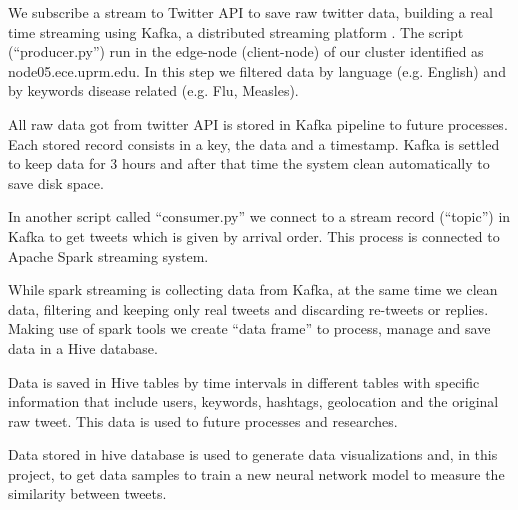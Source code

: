 \documentclass[12pt]{report}
\begin{document}
\begin{steps}
\item We subscribe a stream to Twitter \ac{API} to save raw twitter data, building a real time streaming using Kafka, a distributed streaming platform \cite{Kafka2019}. The script (``producer.py'') run in the edge-node (client-node) of our cluster identified as node05.ece.uprm.edu. In this step we filtered data by language (e.g. English) and by keywords disease related (e.g. Flu, Measles).

\item All raw data got from twitter \ac{API} is stored in Kafka pipeline to future processes. Each stored record consists in a key, the data and a timestamp. Kafka is settled to keep data for 3 hours and after that time the system clean automatically to save disk space. 

\item In another script called ``consumer.py'' we connect to a stream record (``topic'') in Kafka to get tweets which is given by arrival order. This process is connected to Apache Spark streaming system.

\item While spark streaming is collecting data from Kafka, at the same time we clean data, filtering and keeping only real tweets and discarding re-tweets or replies. Making use of spark tools we create ``data frame'' to process, manage and save data in a Hive database.

\item Data is saved in Hive tables by time intervals in different tables with specific information that include users, keywords, hashtags, geolocation and the original raw tweet. This data is used to future processes and researches.

\item Data stored in hive database is used to generate data visualizations and, in this project, to get data samples to train a new neural network model to measure the similarity between tweets.

\end{steps}
\end{document}

